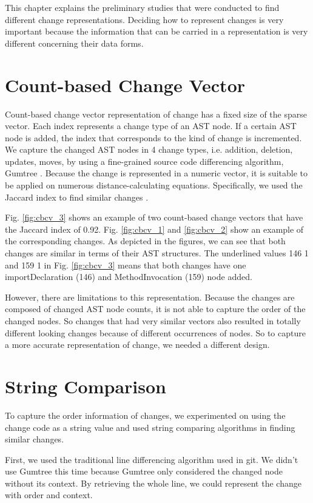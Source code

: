 This chapter explains the preliminary studies that were conducted to find different change representations.
Deciding how to represent changes is very important because the information that can be carried in a representation is very different concerning their data forms.

\section{Count-based Change Vector}
Count-based change vector representation of change has a fixed size of the sparse vector.
Each index represents a change type of an AST node.
If a certain AST node is added, the index that corresponds to the kind of change is incremented.
We capture the changed AST nodes in 4 change types, i.e. addition, deletion, updates, moves, by using a fine-grained source code differencing algorithm, Gumtree \cite{falleri2014fine}.
Because the change is represented in a numeric vector, it is suitable to be applied on numerous distance-calculating equations.
Specifically, we used the Jaccard index to find similar changes \cite{cha2007comprehensive}.

Fig. \ref{fig:cbcv_3} shows an example of two count-based change vectors that have the Jaccard index of 0.92.
Fig. \ref{fig:cbcv_1} and \ref{fig:cbcv_2} show an example of the corresponding changes.  
As depicted in the figures, we can see that both changes are similar in terms of their AST structures.
The underlined values 146 1 and 159 1 in Fig. \ref{fig:cbcv_3} means that both changes have one importDeclaration (146) and MethodInvocation (159) node added.

However, there are limitations to this representation.
Because the changes are composed of changed AST node counts, it is not able to capture the order of the changed nodes.
So changes that had very similar vectors also resulted in totally different looking changes because of different occurrences of nodes.
So to capture a more accurate representation of change, we needed a different design. 

\section{String Comparison}
To capture the order information of changes, we experimented on using the change code as a string value and used string comparing algorithms in finding similar changes.

First, we used the traditional line differencing algorithm used in git.
We didn't use Gumtree this time because Gumtree only considered the changed node without its context.
By retrieving the whole line, we could represent the change with order and context.

